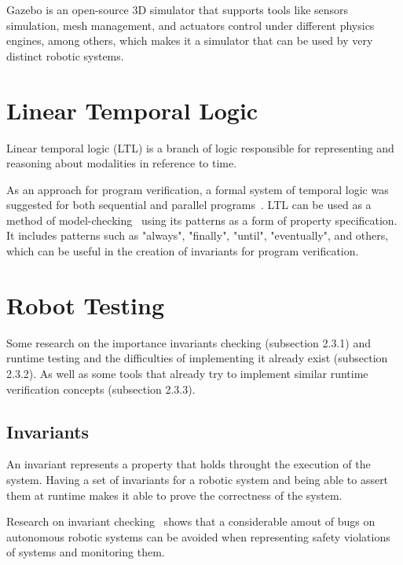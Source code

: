 Gazebo is an open-source 3D simulator that supports tools like sensors simulation, mesh management, and actuators control under different physics engines, among others, which makes it a simulator that can be used by very distinct robotic systems.

\section{Linear Temporal Logic}
\label{sec:ltl}

Linear temporal logic (LTL) is a branch of logic responsible for representing and reasoning about modalities in reference to time. 

As an approach for program verification, a formal system of temporal logic was suggested for both sequential and parallel programs~\cite{pnueli1977temporal}. LTL can be used as a method of model-checking~\cite{dwyer1998property} using its patterns as a form of property specification. It includes patterns such as "always", "finally", "until", "eventually", and others, which can be useful in the creation of invariants for program verification.

\section{Robot Testing}
\label{sec:robottesting}

Some research on the importance invariants checking (subsection 2.3.1) and runtime testing and the difficulties of implementing it already exist (subsection 2.3.2). As well as some tools that already try to implement similar runtime verification concepts (subsection 2.3.3).

\subsection{Invariants}

An invariant represents a property that holds throught the execution of the system. Having a set of invariants for a robotic system and being able to assert them at runtime makes it able to prove the correctness of the system.

Research on invariant checking~\cite{zizyte2021importance} shows that a considerable amout of bugs on autonomous robotic systems can be avoided when representing safety violations of systems and monitoring them.

